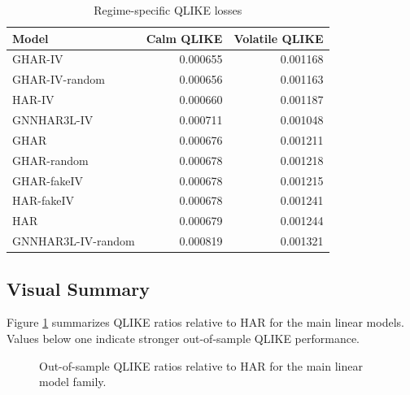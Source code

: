 \documentclass[11pt,a4paper]{article}
\begin{document}
\begin{table}[t]
\centering
\caption{Regime-specific QLIKE losses}
\label{tab:regime}
\begin{tabular}{lrr}
\toprule
Model & Calm QLIKE & Volatile QLIKE \\
\midrule
GHAR-IV & 0.000655 & 0.001168 \\
GHAR-IV-random & 0.000656 & 0.001163 \\
HAR-IV & 0.000660 & 0.001187 \\
GNNHAR3L-IV & 0.000711 & 0.001048 \\
GHAR & 0.000676 & 0.001211 \\
GHAR-random & 0.000678 & 0.001218 \\
GHAR-fakeIV & 0.000678 & 0.001215 \\
HAR-fakeIV & 0.000678 & 0.001241 \\
HAR & 0.000679 & 0.001244 \\
GNNHAR3L-IV-random & 0.000819 & 0.001321 \\
\bottomrule
\end{tabular}
\end{table}

\subsection{Visual Summary}

Figure \ref{fig:modelbars} summarizes QLIKE ratios relative to HAR for the main linear models.
Values below one indicate stronger out-of-sample QLIKE performance.

\begin{figure}[t]
\centering
{}
\caption{Out-of-sample QLIKE ratios relative to HAR for the main linear model family.}
\label{fig:modelbars}
\end{figure}
\FloatBarrier
\end{document}
